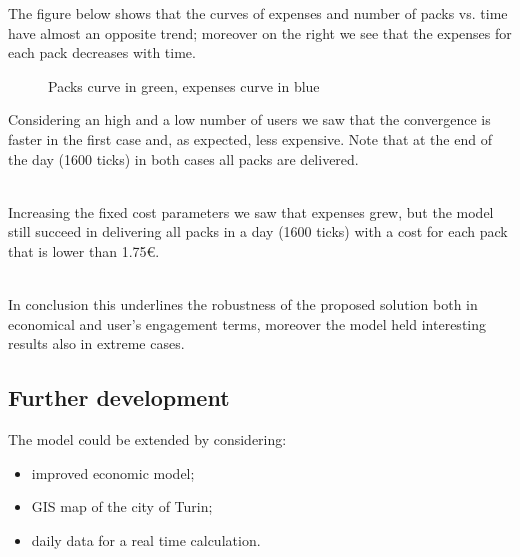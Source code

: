 \documentclass[11pt,a4paper]{article}
\begin{document}
The figure below shows that the curves of expenses and number of packs vs. time have almost an opposite trend; moreover on the right we see that the expenses for each pack decreases with time.
\begin{figure}[h!]
\centering
\caption*{Packs curve in green, expenses curve in blue}
\end{figure}
\newpage
Considering an high and a low number of users we saw that the convergence is faster in the first case and, as expected, less expensive. Note that at the end of the day (1600 ticks) in both cases all packs are delivered.
\begin{figure}[h!]
\centering
\end{figure}
\\
Increasing the fixed cost parameters we saw that expenses grew, but the model still succeed in delivering all packs in a day (1600 ticks) with a cost for each pack that is lower than 1.75\euro{}.
\begin{figure}[h!]
\centering
\end{figure}
\\
In conclusion this underlines the robustness of the proposed solution both in economical and user's engagement terms, moreover the model held interesting results also in extreme cases. 

\subsection*{Further development}
The model could be extended by considering:
\begin{itemize}
\item improved economic model;
\item GIS map of the city of Turin;
\item daily data for a real time calculation.
\end{itemize}
\end{document}
